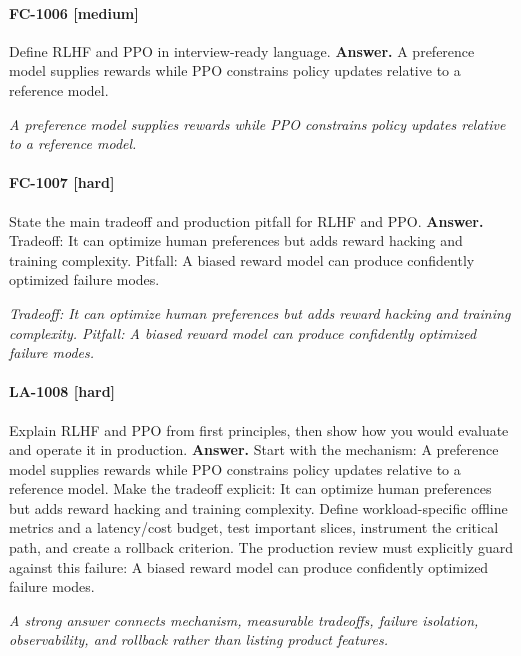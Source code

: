 \paragraph{FC-1006 [medium]} Define RLHF and PPO in interview-ready language.
\noindent\textbf{Answer.} A preference model supplies rewards while PPO constrains policy updates relative to a reference model.
\par\textit{A preference model supplies rewards while PPO constrains policy updates relative to a reference model.}
\paragraph{FC-1007 [hard]} State the main tradeoff and production pitfall for RLHF and PPO.
\noindent\textbf{Answer.} Tradeoff: It can optimize human preferences but adds reward hacking and training complexity. Pitfall: A biased reward model can produce confidently optimized failure modes.
\par\textit{Tradeoff: It can optimize human preferences but adds reward hacking and training complexity. Pitfall: A biased reward model can produce confidently optimized failure modes.}
\paragraph{LA-1008 [hard]} Explain RLHF and PPO from first principles, then show how you would evaluate and operate it in production.
\noindent\textbf{Answer.} Start with the mechanism: A preference model supplies rewards while PPO constrains policy updates relative to a reference model. Make the tradeoff explicit: It can optimize human preferences but adds reward hacking and training complexity. Define workload-specific offline metrics and a latency/cost budget, test important slices, instrument the critical path, and create a rollback criterion. The production review must explicitly guard against this failure: A biased reward model can produce confidently optimized failure modes.
\par\textit{A strong answer connects mechanism, measurable tradeoffs, failure isolation, observability, and rollback rather than listing product features.}
